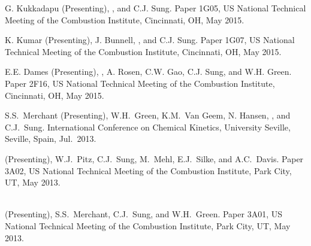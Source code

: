 \begin{bibmune}
\item G. Kukkadapu (Presenting), , and C.J. Sung. 
        Paper 1G05,  US National Technical Meeting of the
        Combustion Institute, Cincinnati, OH, May 2015.

\item K. Kumar (Presenting), J. Bunnell, , and C.J. Sung.
        Paper 1G07,  US National Technical Meeting of the
        Combustion Institute, Cincinnati, OH, May 2015.

\item E.E. Dames (Presenting), , A. Rosen, C.W. Gao, C.J.
        Sung, and W.H. Green. 
        Paper 2F16,  US National Technical Meeting of the
        Combustion Institute, Cincinnati, OH, May 2015.

\item S.S.\ Merchant (Presenting), W.H.\ Green, K.M.\ Van Geem, N.
        Hansen, , and C.J.\ Sung.
          International
        Conference on Chemical Kinetics, University Seville, Seville,
        Spain, Jul.\ 2013.

\item {} (Presenting), W.J.\ Pitz, C.J.\ Sung, M.\ Mehl,
        E.J.\ Silke, and A.C.\ Davis. 
        Paper 3A02,  US National Technical Meeting of the
        Combustion Institute, Park City, UT, May 2013.\\
        \\

\item {} (Presenting), S.S.\ Merchant, C.J.\ Sung, and
        W.H.\ Green.  Paper 3A01,  US National
        Technical Meeting of the Combustion Institute, Park City, UT, May
        2013.\\
        \\


\end{bibmune}
